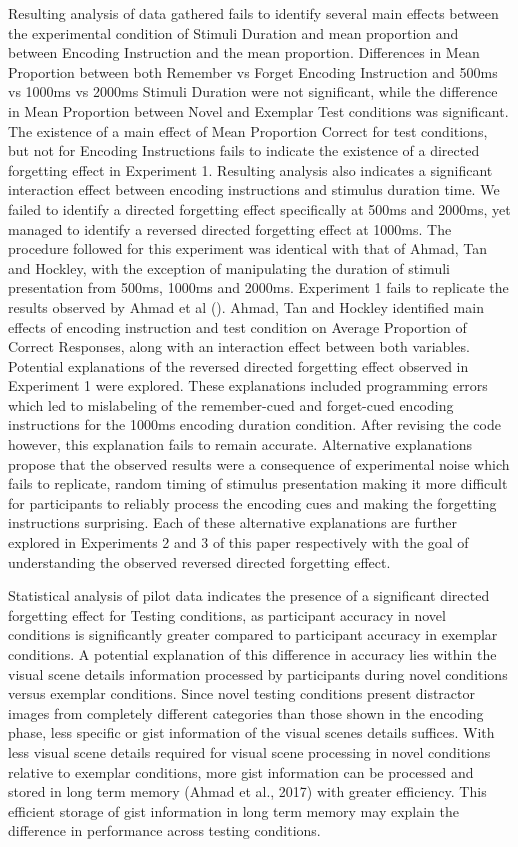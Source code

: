 \documentclass[
  english,
  man,floatsintext]{apa6}
\begin{document}
Resulting analysis of data gathered fails to identify several main effects between the experimental condition of Stimuli Duration and mean proportion and between Encoding Instruction and the mean proportion. Differences in Mean Proportion between both Remember vs Forget Encoding Instruction and 500ms vs 1000ms vs 2000ms Stimuli Duration were not significant, while the difference in Mean Proportion between Novel and Exemplar Test conditions was significant. The existence of a main effect of Mean Proportion Correct for test conditions, but not for Encoding Instructions fails to indicate the existence of a directed forgetting effect in Experiment 1. Resulting analysis also indicates a significant interaction effect between encoding instructions and stimulus duration time. We failed to identify a directed forgetting effect specifically at 500ms and 2000ms, yet managed to identify a reversed directed forgetting effect at 1000ms.
The procedure followed for this experiment was identical with that of Ahmad, Tan and Hockley, with the exception of manipulating the duration of stimuli presentation from 500ms, 1000ms and 2000ms. Experiment 1 fails to replicate the results observed by Ahmad et al (). Ahmad, Tan and Hockley identified main effects of encoding instruction and test condition on Average Proportion of Correct Responses, along with an interaction effect between both variables.
Potential explanations of the reversed directed forgetting effect observed in Experiment 1 were explored. These explanations included programming errors which led to mislabeling of the remember-cued and forget-cued encoding instructions for the 1000ms encoding duration condition. After revising the code however, this explanation fails to remain accurate. Alternative explanations propose that the observed results were a consequence of experimental noise which fails to replicate, random timing of stimulus presentation making it more difficult for participants to reliably process the encoding cues and making the forgetting instructions surprising. Each of these alternative explanations are further explored in Experiments 2 and 3 of this paper respectively with the goal of understanding the observed reversed directed forgetting effect.

Statistical analysis of pilot data indicates the presence of a significant directed forgetting effect for Testing conditions, as participant accuracy in novel conditions is significantly greater compared to participant accuracy in exemplar conditions. A potential explanation of this difference in accuracy lies within the visual scene details information processed by participants during novel conditions versus exemplar conditions. Since novel testing conditions present distractor images from completely different categories than those shown in the encoding phase, less specific or gist information of the visual scenes details suffices. With less visual scene details required for visual scene processing in novel conditions relative to exemplar conditions, more gist information can be processed and stored in long term memory (Ahmad et al., 2017) with greater efficiency. This efficient storage of gist information in long term memory may explain the difference in performance across testing conditions.
\end{document}
